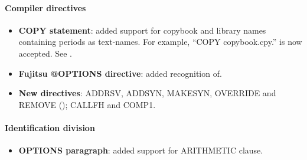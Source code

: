 \paragraph{Compiler directives}
\begin{itemize}
\item \textbf{COPY statement}: added support for copybook and library names containing periods as text-names. For example,  ``COPY copybook.cpy.'' is now accepted. See .
\item \textbf{Fujitsu @OPTIONS directive}: added recognition of.
\item \textbf{New directives}: ADDRSV, ADDSYN, MAKESYN, OVERRIDE and REMOVE (); CALLFH and COMP1.
\end{itemize}

\paragraph{Identification division}
\begin{itemize}
\item \textbf{OPTIONS paragraph}: added support for ARITHMETIC clause.
\end{itemize}

